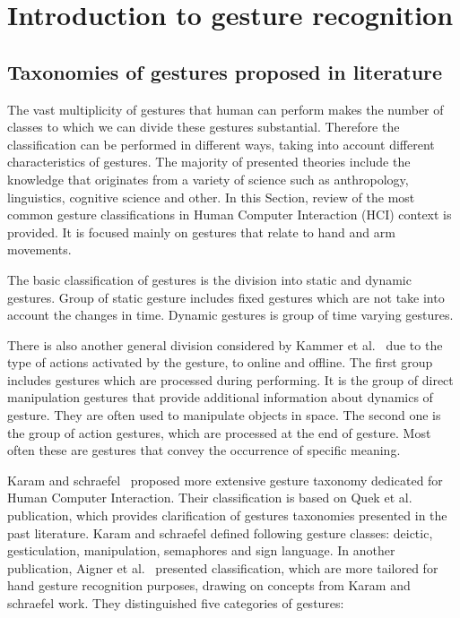 \chapter{Introduction to gesture recognition}\label{introGRChapter}

\section{Taxonomies of gestures proposed in literature}\label{taxonomySection}
The vast multiplicity of gestures that human can perform makes the number of classes to which we can divide these gestures substantial. Therefore the classification can be performed in different ways, taking into account different characteristics of gestures. The majority of presented theories include the knowledge that originates from a variety of science such as anthropology, linguistics, cognitive science and other. In this Section, review of the most common gesture classifications in Human Computer Interaction (HCI) context is provided. It is focused mainly on gestures that relate to hand and arm movements.

The basic classification of gestures is the division into static and dynamic gestures. Group of static gesture includes fixed gestures which are not take into account the changes in time. Dynamic gestures is group of time varying gestures.

There is also another general division considered by Kammer et al.~\cite{kammer_taxonomy_2010} due to the type of actions activated by the gesture, to online and offline. The first group includes gestures which are processed during performing. It is the group of direct manipulation gestures that provide additional information about dynamics of gesture. They are often used to manipulate objects in space. The second one is the group of action gestures, which are processed at the end of gesture. Most often these are gestures that convey the occurrence of specific meaning.

Karam and schraefel~\cite{Karam05ataxonomy} proposed more extensive gesture taxonomy dedicated for Human Computer Interaction. Their classification is based on Quek et al.~\cite{Quek:2002:MHD:568513.568514} publication, which provides clarification of gestures taxonomies presented in the past literature. Karam and schraefel defined following gesture classes: deictic, gesticulation, manipulation, semaphores and sign language. In another publication, Aigner et al.~\cite{AignerTaxonomy} presented classification, which are more tailored for hand gesture recognition purposes, drawing on concepts from Karam and schraefel work. They distinguished five categories of gestures:

